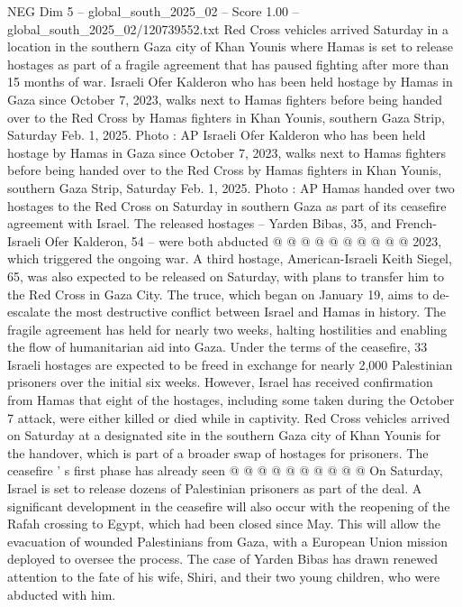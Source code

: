 \begin{textsample}{NEG Dim 5 – global\_south\_2025\_02 – Score 1.00 – global\_south\_2025\_02/120739552.txt}  \label{ex:f5_neg_303}
Red Cross vehicles arrived Saturday in a location in the southern Gaza city of Khan Younis where Hamas is set to release hostages as part of a fragile agreement that has paused fighting after more than 15 months of war.
Israeli Ofer Kalderon who has been held hostage by Hamas in Gaza since October 7, 2023, walks next to Hamas fighters before being handed over to the Red Cross by Hamas fighters in Khan Younis, southern Gaza Strip, Saturday Feb. 1, 2025.
Photo : AP Israeli Ofer Kalderon who has been held hostage by Hamas in Gaza since October 7, 2023, walks next to Hamas fighters before being handed over to the Red Cross by Hamas fighters in Khan Younis, southern Gaza Strip, Saturday Feb. 1, 2025.
Photo : AP Hamas handed over two hostages to the Red Cross on Saturday in southern Gaza as part of its ceasefire agreement with Israel.
The released hostages -- Yarden Bibas, 35, and French-Israeli Ofer Kalderon, 54 -- were both abducted @ @ @ @ @ @ @ @ @ @ 2023, which triggered the ongoing war.
A third hostage, American-Israeli Keith Siegel, 65, was also expected to be released on Saturday, with plans to transfer him to the Red Cross in Gaza City.
The truce, which began on January 19, aims to de-escalate the most destructive conflict between Israel and Hamas in history.
The fragile agreement has held for nearly two weeks, halting hostilities and enabling the flow of humanitarian aid into Gaza.
Under the terms of the ceasefire, 33 Israeli hostages are expected to be freed in exchange for nearly 2,000 Palestinian prisoners over the initial six weeks.
However, Israel has received confirmation from Hamas that eight of the hostages, including some taken during the October 7 attack, were either killed or died while in captivity.
Red Cross vehicles arrived on Saturday at a designated site in the southern Gaza city of Khan Younis for the handover, which is part of a broader swap of hostages for prisoners.
The ceasefire ' s first phase has already seen @ @ @ @ @ @ @ @ @ @ On Saturday, Israel is set to release dozens of Palestinian prisoners as part of the deal.
A significant development in the ceasefire will also occur with the reopening of the Rafah crossing to Egypt, which had been closed since May.
This will allow the evacuation of wounded Palestinians from Gaza, with a European Union mission deployed to oversee the process.
The case of Yarden Bibas has drawn renewed attention to the fate of his wife, Shiri, and their two young children, who were abducted with him.

\end{textsample}
